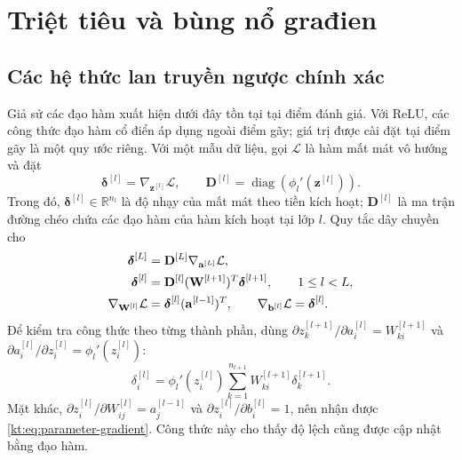 \section{Triệt tiêu và bùng nổ građien}
\label{kt:sec:gradient}

\subsection{Các hệ thức lan truyền ngược chính xác}

Giả sử các đạo hàm xuất hiện dưới đây tồn tại tại điểm đánh giá.
Với ReLU, các công thức đạo hàm cổ điển áp dụng ngoài điểm gãy;
giá trị được cài đặt tại điểm gãy là một quy ước riêng.
Với một mẫu dữ liệu, gọi $\mathcal L$ là hàm mất mát vô hướng và đặt
\begin{equation}
 \boldsymbol\delta^{[l]}=\nabla_{\mathbf z^{[l]}}\mathcal L,
 \qquad
 \mathbf D^{[l]}=\operatorname{diag}
                     (\phi_l'(\mathbf z^{[l]})).
 \label{kt:eq:delta-definition}
\end{equation}
Trong đó, $\boldsymbol\delta^{[l]}\in\mathbb R^{n_l}$ là độ nhạy
của mất mát theo tiền kích hoạt; $\mathbf D^{[l]}$ là ma trận đường
chéo chứa các đạo hàm của hàm kích hoạt tại lớp $l$.
Quy tắc dây chuyền cho
\begin{align}
 \boldsymbol\delta^{[L]}
 &=\mathbf D^{[L]}\nabla_{\mathbf a^{[L]}}\mathcal L,\notag\\
 \boldsymbol\delta^{[l]}
 &=\mathbf D^{[l]}(\mathbf W^{[l+1]})^T
                         \boldsymbol\delta^{[l+1]},
                         \qquad 1\leq l<L,\label{kt:eq:delta-recursion}\\
 \nabla_{\mathbf W^{[l]}}\mathcal L
 &=\boldsymbol\delta^{[l]}(\mathbf a^{[l-1]})^T,
 \qquad \nabla_{\mathbf b^{[l]}}\mathcal L
 =\boldsymbol\delta^{[l]}.
 \label{kt:eq:parameter-gradient}
\end{align}
Để kiểm tra công thức theo từng thành phần, dùng
$\partial z_k^{[l+1]}/\partial a_i^{[l]}=W_{ki}^{[l+1]}$ và
$\partial a_i^{[l]}/\partial z_i^{[l]}=\phi_l'(z_i^{[l]})$:
\[
 \delta_i^{[l]}=\phi_l'(z_i^{[l]})
                   \sum_{k=1}^{n_{l+1}}W_{ki}^{[l+1]}\delta_k^{[l+1]}.
\]
Mặt khác, $\partial z_i^{[l]}/\partial W_{ij}^{[l]}=a_j^{[l-1]}$
và $\partial z_i^{[l]}/\partial b_i^{[l]}=1$, nên nhận được
\eqref{kt:eq:parameter-gradient}. Công thức này cho thấy độ lệch
cũng được cập nhật bằng đạo hàm.

